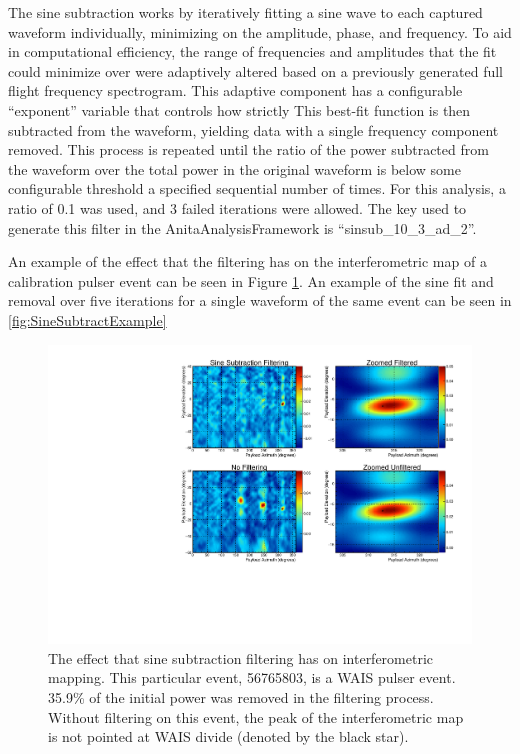 	The sine subtraction works by iteratively fitting a sine wave to each captured waveform individually, minimizing on the amplitude, phase, and frequency.   To aid in computational efficiency, the range of frequencies and amplitudes that the fit could minimize over were adaptively altered based on a previously generated full flight frequency spectrogram.  This adaptive component has a configurable ``exponent'' variable that controls how strictly   This best-fit function is then subtracted from the waveform, yielding data with a single frequency component removed.  This process is repeated until the ratio of the power subtracted from the waveform over the total power in the original waveform is below some configurable threshold a specified sequential number of times.  For this analysis, a ratio of 0.1 was used, and 3 failed iterations were allowed.  The key used to generate this filter in the AnitaAnalysisFramework is ``sinsub\_10\_3\_ad\_2''.  
	
	An example of the effect that the filtering has on the interferometric map of a calibration pulser event can be seen in Figure \ref{fig:SineSubtractMaps}.  An example of the sine fit and removal over five iterations for a single waveform of the same event can be seen in \ref{fig:SineSubtractExample} 
	
\begin{figure}
	\centering
	\includegraphics[height=0.5\textheight]{figures/SineSubtractMaps}
	\caption{The effect that sine subtraction filtering has on interferometric mapping.  This particular event, 56765803, is a WAIS pulser event.  35.9\% of the initial power was removed in the filtering process.  Without filtering on this event, the peak of the interferometric map is not pointed at WAIS divide (denoted by the black star).} 
	\label{fig:SineSubtractMaps}
\end{figure}

